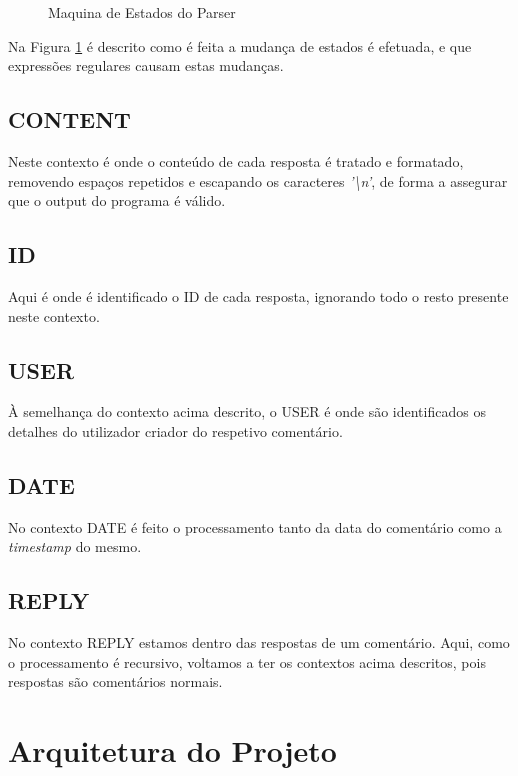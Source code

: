 \documentclass[a4paper]{report}
\begin{document}
\begin{figure}[H]
    
    \caption{Maquina de Estados do Parser}\label{fig:parser_state_machine}
\end{figure}

Na Figura \ref{fig:parser_state_machine} é descrito como é feita a mudança de
estados é efetuada, e que expressões regulares causam estas mudanças.
\pagebreak

\subsection{CONTENT}

Neste contexto é onde o conteúdo de cada resposta é tratado e formatado,
removendo espaços repetidos e escapando os caracteres \textit{'\textbackslash n'},
de forma a assegurar que o output do programa é válido.

\subsection{ID}

Aqui é onde é identificado o ID de cada resposta, ignorando todo o resto
presente neste contexto.

\subsection{USER}

À semelhança do contexto acima descrito, o USER é onde são identificados
os detalhes do utilizador criador do respetivo comentário.

\subsection{DATE}

No contexto DATE é feito o processamento tanto da data do comentário como
a \textit{timestamp} do mesmo.

\subsection{REPLY}

No contexto REPLY estamos dentro das respostas de um comentário. Aqui,
como o processamento é recursivo, voltamos a ter os contextos acima descritos,
pois respostas são comentários normais.

\section{Arquitetura do Projeto}
\end{document}
